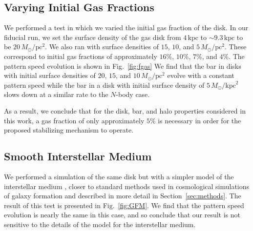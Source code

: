 \documentclass[fleqn,usenatbib]{mnras}
\newcommand{\Nbody}{$N$-body}
\newcommand{\Msun}{\ensuremath{M_{\odot}}}
\begin{document}
\subsection{Varying Initial Gas Fractions}
We performed a test in which we varied the initial gas fraction of the
disk. In our fiducial run, we set the surface density of the gas disk from
$4\,\textrm{kpc}$ to $\sim9.3\,\textrm{kpc}$ to be $20\,\Msun/\textrm{pc}^2$.
We also ran with surface densities of $15$, $10$, and
$5\,\Msun/\textrm{pc}^2$. These correspond to initial gas fractions of
approximately $16\%$, $10\%$, $7\%$, and $4\%$. The pattern speed evolution is
shown in Fig.~\ref{fig:fgas} We find that the bar in disks with
initial surface densities of $20$, $15$, and $10\,\Msun/\textrm{pc}^2$ evolve
with a constant pattern speed while the bar in a disk with initial surface
density of $5\,\Msun/\textrm{kpc}^2$ slows down at a similar rate to the \Nbody{} case.

As a result, we conclude that for the disk, bar, and halo properties
considered in this work, a gas fraction of only approximately $5\%$ is
necessary in order for the proposed stabilizing mechanism to operate.



\subsection{Smooth Interstellar Medium}
We performed a simulation of the same disk but with a simpler model of the
interstellar medium \citep{2003MNRAS.339..289S}, closer to standard methods used
in cosmological simulations of galaxy formation and described in more detail in
Section~\ref{sec:methods}. The result of this test is presented in
Fig.~\ref{fig:GFM}. We find that the pattern speed evolution is nearly the same
in this case, and so conclude that our result is not sensitive to the details of
the model for the interstellar medium.
\end{document}
